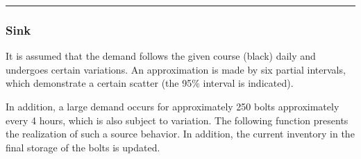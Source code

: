 \documentclass[letterpaper,10pt,english]{sphinxmanual}
\begin{document}
\begin{sphinxVerbatim}[commandchars=\\\{\}]
    

     
           
         

      

     

      

      
\end{sphinxVerbatim}


\bigskip\hrule\bigskip



\subsubsection{Sink}
\label{\detokenize{source/Examples/example03:sink}}\label{\detokenize{source/Examples/example03:temperature1}}
\sphinxAtStartPar
It is assumed that the demand follows the given course (black) daily and undergoes certain variations. An approximation
is made by six partial intervals, which demonstrate a certain scatter (the 95\% interval is indicated).


\sphinxAtStartPar
In addition, a large demand occurs for approximately 250 bolts approximately every 4 hours, which is also subject to
variation. The following function presents the realization of such a source behavior. In addition, the current inventory
in the final storage of the bolts is updated.
\end{document}

